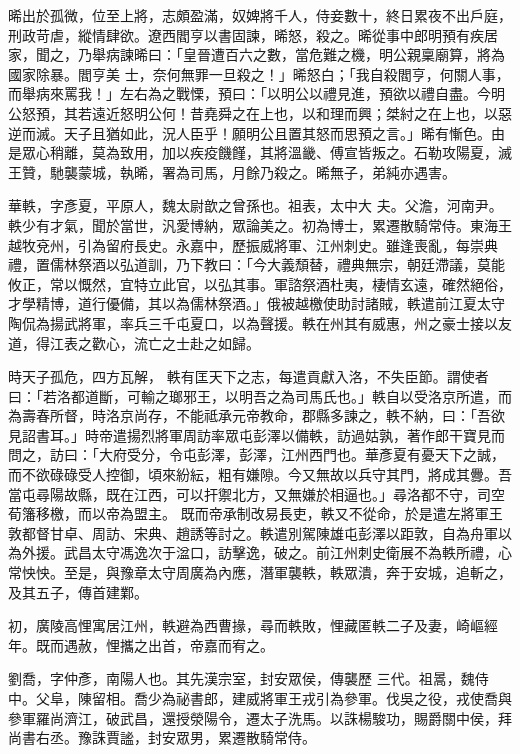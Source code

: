 \begin{pinyinscope}
 晞出於孤微，位至上將，志頗盈滿，奴婢將千人，侍妾數十，終日累夜不出戶庭，刑政苛虐，縱情肆欲。遼西閻亨以書固諫，晞怒，殺之。晞從事中郎明預有疾居家，聞之，乃舉病諫晞曰：「皇晉遭百六之數，當危難之機，明公親稟廟算，將為國家除暴。閻亨美
 士，奈何無罪一旦殺之！」晞怒白；「我自殺閻亨，何關人事，而舉病來罵我！」左右為之戰慄，預曰：「以明公以禮見進，預欲以禮自盡。今明公怒預，其若遠近怒明公何！昔堯舜之在上也，以和理而興；桀紂之在上也，以惡逆而滅。天子且猶如此，況人臣乎！願明公且置其怒而思預之言。」晞有慚色。由是眾心稍離，莫為致用，加以疾疫饑饉，其將溫畿、傅宣皆叛之。石勒攻陽夏，滅王贊，馳襲蒙城，執晞，署為司馬，月餘乃殺之。晞無子，弟純亦遇害。



 華軼，字彥夏，平原人，魏太尉歆之曾孫也。祖表，太中大
 夫。父澹，河南尹。軼少有才氣，聞於當世，汎愛博納，眾論美之。初為博士，累遷散騎常侍。東海王越牧兗州，引為留府長史。永嘉中，歷振威將軍、江州刺史。雖逢喪亂，每崇典禮，置儒林祭酒以弘道訓，乃下教曰：「今大義頹替，禮典無宗，朝廷滯議，莫能攸正，常以慨然，宜特立此官，以弘其事。軍諮祭酒杜夷，棲情玄遠，確然絕俗，才學精博，道行優備，其以為儒林祭酒。」俄被越檄使助討諸賊，軼遣前江夏太守陶侃為揚武將軍，率兵三千屯夏口，以為聲援。軼在州其有威惠，州之豪士接以友道，得江表之歡心，流亡之士赴之如歸。



 時天子孤危，四方瓦解，
 軼有匡天下之志，每遣貢獻入洛，不失臣節。謂使者曰：「若洛都道斷，可輸之瑯邪王，以明吾之為司馬氏也。」軼自以受洛京所遣，而為壽春所督，時洛京尚存，不能祗承元帝教命，郡縣多諫之，軼不納，曰：「吾欲見詔書耳。」時帝遣揚烈將軍周訪率眾屯彭澤以備軼，訪過姑孰，著作郎干寶見而問之，訪曰：「大府受分，令屯彭澤，彭澤，江州西門也。華彥夏有憂天下之誠，而不欲碌碌受人控御，頃來紛紜，粗有嫌隙。今又無故以兵守其門，將成其釁。吾當屯尋陽故縣，既在江西，可以扞禦北方，又無嫌於相逼也。」尋洛都不守，司空荀籓移檄，而以帝為盟主。
 既而帝承制改易長吏，軼又不從命，於是遣左將軍王敦都督甘卓、周訪、宋典、趙誘等討之。軼遣別駕陳雄屯彭澤以距敦，自為舟軍以為外援。武昌太守馮逸次于湓口，訪擊逸，破之。前江州刺史衛展不為軼所禮，心常怏怏。至是，與豫章太守周廣為內應，潛軍襲軼，軼眾潰，奔于安城，追斬之，及其五子，傳首建鄴。



 初，廣陵高悝寓居江州，軼避為西曹掾，尋而軼敗，悝藏匿軼二子及妻，崎嶇經年。既而遇赦，悝攜之出首，帝嘉而宥之。



 劉喬，字仲彥，南陽人也。其先漢宗室，封安眾侯，傳襲歷
 三代。祖暠，魏侍中。父阜，陳留相。喬少為祕書郎，建威將軍王戎引為參軍。伐吳之役，戎使喬與參軍羅尚濟江，破武昌，還授滎陽令，遷太子洗馬。以誅楊駿功，賜爵關中侯，拜尚書右丞。豫誅賈謐，封安眾男，累遷散騎常侍。




\end{pinyinscope}
